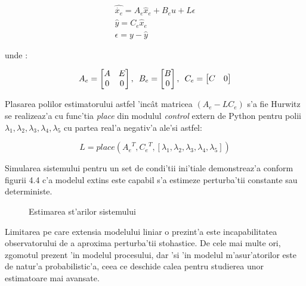 \documentclass[12pt,a4paper,twoside]{report}
\begin{document}
\begin{gather}
    \hat{\dot {x_e}} = A_e \hat x_e + B_e u + L \epsilon \\
    \hat y = C_e \hat x_e \\
    \epsilon = y - \hat y
\end{gather}

unde \cite{Estimation}:

\begin{gather}
    A_e = \begin{bmatrix} A & E \\ 0 & 0 \end{bmatrix}, \hspace{5px}
    B_e = \begin{bmatrix} B\\ 0 \end{bmatrix} , \hspace{5px}
    C_e = \begin{bmatrix} C & 0 \end{bmatrix}
\end{gather}


Plasarea polilor estimatorului astfel 'inc\^{a}t matricea $(A_e - L C_e)$ s'a fie Hurwitz se realizeaz'a cu func'tia \textit{place} \cite{pyplace} din modulul \textit{control} extern de Python pentru polii $\lambda_1,\lambda_2,\lambda_3,\lambda_4,\lambda_5$ cu partea real'a negativ'a ale'si astfel:

\begin{equation}
    L = place({A_e}^T, {C_e}^T, [\lambda_1,\lambda_2,\lambda_3,\lambda_4,\lambda_5])
\end{equation}

Simularea sistemului pentru un set de condi'tii ini'tiale demonstreaz'a conform figurii 4.4 c'a modelul extins este capabil s'a estimeze perturba'tii constante sau deterministe.

\begin{figure}[h]
  \hspace*{-4cm}
  
  \caption{Estimarea st'arilor sistemului}
\end{figure}

Limitarea pe care extensia modelului liniar o prezint'a este incapabilitatea observatorului de a aproxima perturba'tii stohastice. De cele mai multe ori, zgomotul prezent 'in modelul procesului, dar 'si 'in modelul m'asur'atorilor este de natur'a probabilistic'a, ceea ce deschide calea pentru studierea unor estimatoare mai avansate.

\vspace{5px}
\end{document}
